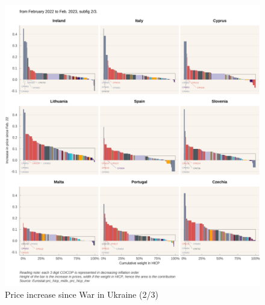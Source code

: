 \documentclass[
  9pt,
  a4paper,
  numbers=noendperiod,
  DIV=12]{scrartcl}
\begin{document}
\begin{figure}[htb]

\caption{\label{fig-priceinc2}Price increase since War in Ukraine (2/3)}

{\centering \includegraphics[width=1\textwidth,height=\textheight]{SIWU_brief_files/figure-pdf/fig-priceinc2-1.png}

}

\end{figure}
\end{document}
